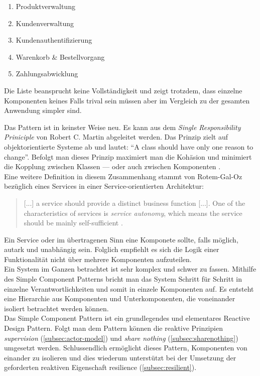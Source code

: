 \begin{enumerate}
\item Produktverwaltung
\item Kundenverwaltung
\item Kundenauthentifizierung
\item Warenkorb \& Bestellvorgang
\item Zahlungsabwicklung
\end{enumerate}

Die Liste beansprucht keine Vollständigkeit und zeigt trotzdem, dass einzelne Komponenten keines Falls trival sein müssen aber im Vergleich zu der gesamten Anwendung simpler sind.

\pagebreak

Das Pattern ist in keinster Weise neu. Es kann aus dem \textit{Single Responsibility Priniciple} von Robert C. Martin abgeleitet werden. Das Prinzip zielt auf objektorientierte Systeme ab und lautet: \enquote{A class should have only one reason to change}. Befolgt man dieses Prinzip maximiert man die Kohäsion und minimiert die Kopplung zwischen Klassen --- oder auch zwischen Komponenten \cite[S.~185]{kuhn_reactive_2015} \cite{martin_single_2014}.\\
Eine weitere Definition in diesem Zusammenhang stammt von Rotem-Gal-Oz bezüglich eines Services in einer Service-orientierten Architektur:

\begin{quotation}
[...] a service should provide a distinct business function [...]. One of the characteristics of services is \textit{service autonomy}, which means the service should be mainly self-sufficient \cite[S.~7]{rotem_soa_2012}.
\end{quotation}

Ein Service oder im übertragenen Sinn eine Komponete sollte, falls möglich, autark und unabhängig sein. Folglich empfiehlt es sich die Logik einer Funktionalität nicht über mehrere Komponenten aufzuteilen.\\

Ein System im Ganzen betrachtet ist sehr komplex und schwer zu fassen. Mithilfe des Simple Component Patterns bricht man das System Schritt für Schritt in einzelne Verantwortlichkeiten und somit in einzele Komponenten auf. Es entsteht eine Hierarchie aus Komponenten und Unterkomponenten, die voneinander isoliert betrachtet werden können.\\
Das Simple Component Pattern ist ein grundlegendes und elementares Reactive Design Pattern. Folgt man dem Pattern können die reaktive Prinzipien \textit{supervision} (\ref{subsec:actor-model}) und \textit{share nothing} (\ref{subsec:sharenothing}) umgesetzt werden. Schlussendlich ermöglicht dieses Pattern, Komponenten von einander zu isolieren und dies wiederum unterstützt bei der Umsetzung der geforderten reaktiven Eigenschaft resilience (\ref{subsec:resilient}).

